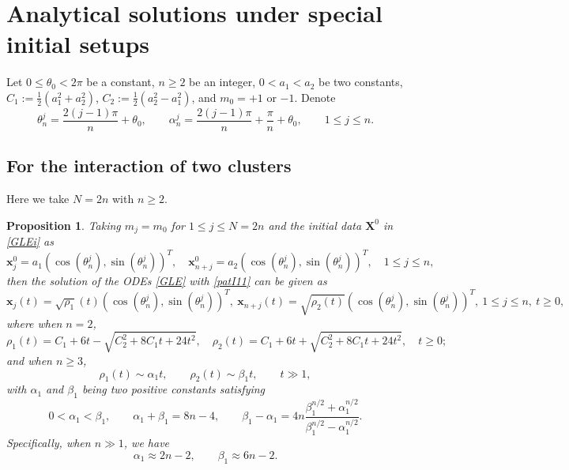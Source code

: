 \documentclass{aims}
\theoremstyle{plain}
\newtheorem{proposition}{Proposition}[section]
\theoremstyle{definition}
\newcommand{\bX}{{\mathbf X}}
\newcommand{\be} {\begin{equation}}
\newcommand{\ee}{\end{equation}}
\newcommand{\bpro}{\begin{proposition} }
\newcommand{\epro}{\end{proposition} }
\begin{document}
\section{Analytical solutions under special initial setups}
\setcounter{equation}{0}
\setcounter{figure}{0}
Let $0\le \theta_0<2\pi$ be a constant, $n\ge2$ be an integer,
$0<a_1<a_2$ be two constants, $C_1:=\frac{1}{2}\left(a_1^2+a_2^2\right)$, $C_2:=\frac{1}{2}\left(a_2^2-a_1^2\right)$, and $m_0=+1$ or $-1$.
Denote
\be
\theta_n^j=\frac{2(j-1)\pi}{n}+\theta_0, \qquad \alpha_n^j=\frac{2(j-1)\pi}{n}+\frac{\pi}{n}+\theta_0, \qquad 1\le j\le n. \nonumber
\ee


\subsection{For the interaction of two clusters}
Here we take $N=2n$ with $n\ge2$.

\bpro\label{lem4}
Taking $m_j=m_0$  for $1\le j\le N=2n$ and
the initial data $\bX^0$ in \eqref{GLEi} as
\be\label{patI11}
\mathbf x_j^0=a_1\left(\cos(\theta_n^j),\sin(\theta_n^j)\right)^T,\quad
\mathbf x_{n+j}^0=a_2\left(\cos(\theta_n^j),\sin(\theta_n^j)\right)^T,
\quad 1\le j\le n,
\ee
then the solution of the ODEs \eqref{GLE} with \eqref{patI11} can be given as
\be\label{solgle11}
\mathbf x_j(t)=\sqrt{\rho_1}(t)\left(\cos(\theta_n^j),\sin(\theta_n^j)\right)^T,\
\mathbf x_{n+j}(t)=\sqrt{\rho_2(t)}\left(\cos(\theta_n^j),\sin(\theta_n^j)\right)^T,
\  1\le j\le n,\   t\ge0,
\ee
where when $n=2$,
\be\label{rho12560}
\rho_1(t)=C_1+6t-
\sqrt{C_2^2+8C_1t+24t^2}, \quad
\rho_2(t)=C_1+6t+
\sqrt{C_2^2+8C_1t+24t^2}, \quad
t\ge0;
\ee
and when $n\ge3$,
\be\label{rho1256}
\rho_1(t)\sim \alpha_1 t,  \qquad \rho_2(t)\sim \beta_1 t, \qquad
t\gg 1,
\ee
with $\alpha_1$ and $\beta_1$ being two positive constants
satisfying
\be \label{apb11}
0<\alpha_1<\beta_1, \qquad \alpha_1+\beta_1=8n-4,\qquad
\beta_1-\alpha_1
=4n\frac{\beta_1^{n/2}+\alpha_1^{n/2}}{\beta_1^{n/2}-\alpha_1^{n/2}}.
\ee
Specifically, when $n\gg1$, we have
\be\label{apb1112}
\alpha_1\approx 2n-2, \qquad \beta_1\approx 6n-2.
\ee
\epro
\end{document}
